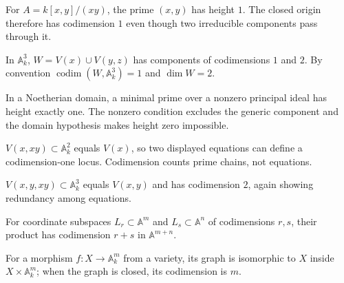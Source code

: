 \begin{example}\label{ex:vi31-adv-01}
For $A=k[x,y]/(xy)$, the prime $(x,y)$ has height $1$. The closed origin therefore has codimension $1$ even though two irreducible components pass through it.
\end{example}

\begin{example}\label{ex:vi31-adv-02}
In $\mathbb A^3_k$, $W=V(x)\cup V(y,z)$ has components of codimensions $1$ and $2$. By convention $\operatorname{codim}(W,\mathbb A^3_k)=1$ and $\dim W=2$.
\end{example}

\begin{example}\label{ex:vi31-adv-03}
In a Noetherian domain, a minimal prime over a nonzero principal ideal has height exactly one. The nonzero condition excludes the generic component and the domain hypothesis makes height zero impossible.
\end{example}

\begin{example}\label{ex:vi31-adv-04}
$V(x,xy)\subset\mathbb A^2_k$ equals $V(x)$, so two displayed equations can define a codimension-one locus. Codimension counts prime chains, not equations.
\end{example}

\begin{example}\label{ex:vi31-adv-05}
$V(x,y,xy)\subset\mathbb A^3_k$ equals $V(x,y)$ and has codimension $2$, again showing redundancy among equations.
\end{example}

\begin{example}\label{ex:vi31-adv-06}
For coordinate subspaces $L_r\subset\mathbb A^m$ and $L_s\subset\mathbb A^n$ of codimensions $r,s$, their product has codimension $r+s$ in $\mathbb A^{m+n}$.
\end{example}

\begin{example}\label{ex:vi31-adv-07}
For a morphism $f:X\to\mathbb A^m_k$ from a variety, its graph is isomorphic to $X$ inside $X\times\mathbb A^m_k$; when the graph is closed, its codimension is $m$.
\end{example}

